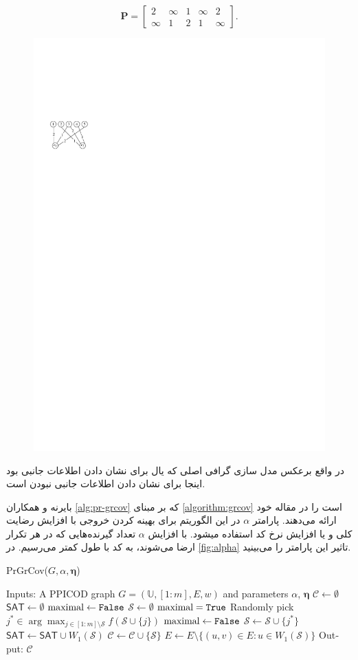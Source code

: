 \begin{example}
\begin{equation*}
	\boldsymbol{P} = 
	\begin{bmatrix}
		2 & \infty & 1 &\infty & 2\\
		\infty & 1 & 2 & 1 & \infty \label{eq:ppicod-instance}
	\end{bmatrix}.
\end{equation*}
\begin{figure}[H]
	\centering
	\includegraphics[width=0.2\linewidth]{figs/chapter4/ppgraph.pdf}
	\caption{}
	\label{fig:ppgraph}
\end{figure}
در واقع برعکس مدل سازی گرافی اصلی که یال برای نشان دادن اطلاعات جانبی بود اینجا برای نشان دادن اطلاعات جانبی نبودن است.
\end{example}
بایرنه و همکاران
\autoref{alg:pr-grcov}
 که بر مبنای 
 \autoref{algorithm:grcov}
  است را در مقاله خود ارائه می‌دهند. پارامتر 
 $\alpha$
 در این الگوریتم برای بهینه کردن خروجی با افزایش رضایت کلی و یا افزایش نرخ کد استفاده میشود. با افزایش 
 $\alpha$
 تعداد گیرنده‌هایی که در هر تکرار ارضا می‌شوند، به کد با طول کمتر می‌رسیم. در 
 \autoref{fig:alpha}
 تاثیر این پارامتر را می‌بینید.
\begin{latin}
\begin{algorithm}
	\caption{PrGrCov($G,\alpha,\boldsymbol{\eta}$)}
	\label{alg:pr-grcov}
	\begin{algorithmic}[1]
		\State Inputs: A PPICOD graph $G=(\mathbb{U}, [1:m], E, w)$ and parameters $\alpha$, $\boldsymbol{\eta}$
		\State $\mathcal{C} \gets \emptyset$
		\State $\mathsf{SAT} \gets \emptyset$ 
		\State $\textrm{maximal} \gets \texttt{False}$
		\State $\mathcal{S} \gets \emptyset$
		\State $\textrm{maximal} = \texttt{True}$
		\State Randomly pick $j^* \in \arg \max_{j \in [1:m] \setminus \mathcal{S}} f(\mathcal{S} \cup \{j\})$
		\State $\textrm{maximal} \gets \texttt{False}$
		\State $\mathcal{S} \gets \mathcal{S} \cup \{j^*\}$
		\EndIf
		\EndWhile
		\State $\mathsf{SAT} \gets \mathsf{SAT} \cup W_1(\mathcal{S})$
		\State $\mathcal{C} \gets \mathcal{C} \cup \{\mathcal{S}\}$
		\State $E \gets E \setminus \{ (u,v) \in E: u \in W_1(\mathcal{S})\}$
		\EndWhile
		\State Output: $\mathcal{C}$
	\end{algorithmic}
\end{algorithm}
\end{latin}

